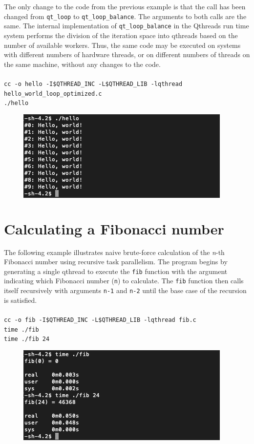 \documentclass[12pt,fullpage]{article}
\begin{document}
The only change to the code from the previous example is that the call has been changed from {\tt qt\_loop} to {\tt qt\_loop\_balance}.  The arguments to both calls are the same.  The internal implementation of {\tt qt\_loop\_balance} in the Qthreads run time system performs the division of the iteration space into qthreads based on the number of available workers.  Thus, the same code may be executed on systems with different numbers of hardware threads, or on different numbers of threads on the same machine, without any changes to the code.
\\ \\
{\footnotesize{\tt cc -o hello -I\$QTHREAD\_INC -L\$QTHREAD\_LIB -lqthread hello\_world\_loop\_optimized.c}}
\\
{\footnotesize{\tt ./hello}}
\begin{figure}[h]
\includegraphics[scale=0.99]{hello_world_optimized.png}
\end{figure}


\newpage
\section{Calculating a Fibonacci number}

The following example illustrates naive brute-force calculation of the {\it n}-th Fibonacci number using recursive task parallelism. The program begins by generating a single qthread to execute the {\tt fib} function with the argument indicating which Fibonacci number ({\tt n}) to calculate.  The {\tt fib} function then calls itself recursively with arguments {\tt n-1} and {\tt n-2} until the base case of the recursion is satisfied.
\\ \\
{\footnotesize{\tt cc -o fib -I\$QTHREAD\_INC -L\$QTHREAD\_LIB -lqthread fib.c}}
\\
{\footnotesize{\tt time ./fib}}
\\
{\footnotesize{\tt time ./fib 24}}

\begin{figure}[h]
\includegraphics[scale=0.96]{fib.png}
\end{figure}
\end{document}

